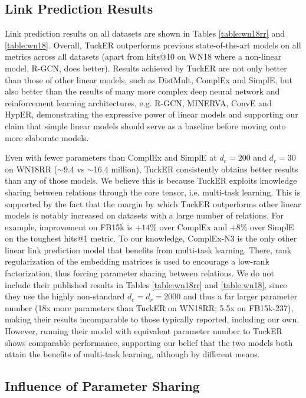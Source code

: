 \documentclass[11pt,a4paper]{article}
\begin{document}
\subsection{Link Prediction Results}
Link prediction results on all datasets are shown in Tables \ref{table:wn18rr} and \ref{table:wn18}. Overall, TuckER outperforms previous state-of-the-art models on all metrics across all datasets (apart from hits@10 on WN18 where a non-linear model, R-GCN, does better). Results achieved by TuckER are not only better than those of other linear models, such as DistMult, ComplEx and SimplE, but also better than the results of many more complex deep neural network and reinforcement learning architectures, e.g. R-GCN, MINERVA, ConvE and HypER, demonstrating the expressive power of linear models and supporting our claim that simple linear models should serve as a baseline before moving onto more elaborate models.

Even with fewer parameters than ComplEx and SimplE at $d_e\!=\!200$ and $d_r\!=\!30$ on WN18RR ($\sim$9.4 vs $\sim$16.4 million), TuckER consistently obtains better results than any of those models. We believe this is because TuckER exploits knowledge sharing between relations through the core tensor, i.e. multi-task learning. This is supported by the fact that the margin by which TuckER outperforms other linear models is notably increased on datasets with a large number of relations. For example, improvement on FB15k is $+14\%$ over ComplEx and $+8\%$ over SimplE on the toughest hits@1 metric. To our knowledge, ComplEx-N3 \cite{lacroix2018canonical} is the only other linear link prediction model that benefits from multi-task learning. There, rank regularization of the embedding matrices is used to encourage a low-rank factorization, thus forcing parameter sharing between relations. We do not include their published results in Tables \ref{table:wn18rr} and \ref{table:wn18}, since they use 
the highly non-standard $d_e \!=\! d_r \!=\! 2000$ and thus a far larger parameter number (18x more parameters than TuckER on WN18RR; 5.5x on FB15k-237), making their results incomparable to those typically reported, including our own. However, running their model with equivalent parameter number to TuckER shows comparable performance, supporting our belief that the two models both attain the benefits of multi-task learning, although by different means.

\subsection{Influence of Parameter Sharing} \label{sec:bound}
\end{document}
